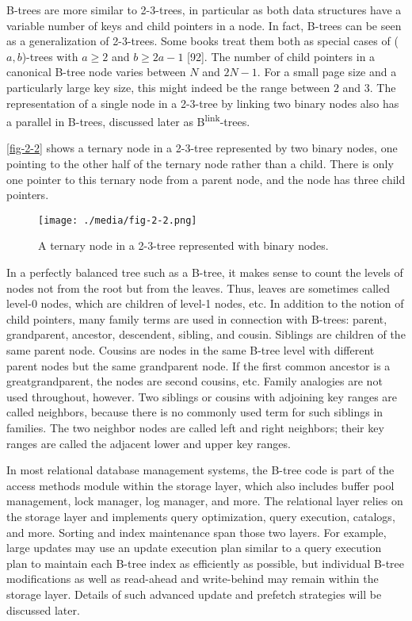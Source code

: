 B-trees are more similar to 2-3-trees, in particular as both data
structures have a variable number of keys and child pointers in a node.
In fact, B-trees can be seen as a generalization of 2-3-trees. Some
books treat them both as special cases of ($a,b$)-trees with
$a \geq 2$ and $b \geq 2a - 1$ {[}92{]}. The number of child
pointers in a canonical B-tree node varies between $N$ and
$2N - 1$. For a small page size and a particularly large key size,
this might indeed be the range between $2$ and $3$. The representation of a
single node in a 2-3-tree by linking two binary nodes also has a
parallel in B-trees, discussed later as B\textsuperscript{link}-trees.

\autoref{fig-2-2} shows a ternary node in a 2-3-tree represented by two binary
nodes, one pointing to the other half of the ternary node rather than a
child. There is only one pointer to this ternary node from a parent
node, and the node has three child pointers.

\begin{figure}
  \centering
  \texttt{[image: ./media/fig-2-2.png]}

  \caption{A ternary node in a 2-3-tree represented with binary nodes.\label{fig-2-2}}
\end{figure}

In a perfectly balanced tree such as a B-tree, it makes sense to count
the levels of nodes not from the root but from the leaves. Thus, leaves
are sometimes called level-0 nodes, which are children of level-1 nodes,
etc. In addition to the notion of child pointers, many family terms are
used in connection with B-trees: parent, grandparent, ancestor,
descendent, sibling, and cousin. Siblings are children of the same
parent node. Cousins are nodes in the same B-tree level with different
parent nodes but the same grandparent node. If the first common ancestor
is a greatgrandparent, the nodes are second cousins, etc. Family
analogies are not used throughout, however. Two siblings or cousins with
adjoining key ranges are called neighbors, because there is no commonly
used term for such siblings in families. The two neighbor nodes are
called left and right neighbors; their key ranges are called the
adjacent lower and upper key ranges.

In most relational database management systems, the B-tree code is part
of the access methods module within the storage layer, which also
includes buffer pool management, lock manager, log manager, and more.
The relational layer relies on the storage layer and implements query
optimization, query execution, catalogs, and more. Sorting and index
maintenance span those two layers. For example, large updates may use an
update execution plan similar to a query execution plan to maintain each
B-tree index as efficiently as possible, but individual B-tree
modifications as well as read-ahead and write-behind may remain within
the storage layer. Details of such advanced update and prefetch
strategies will be discussed later.

